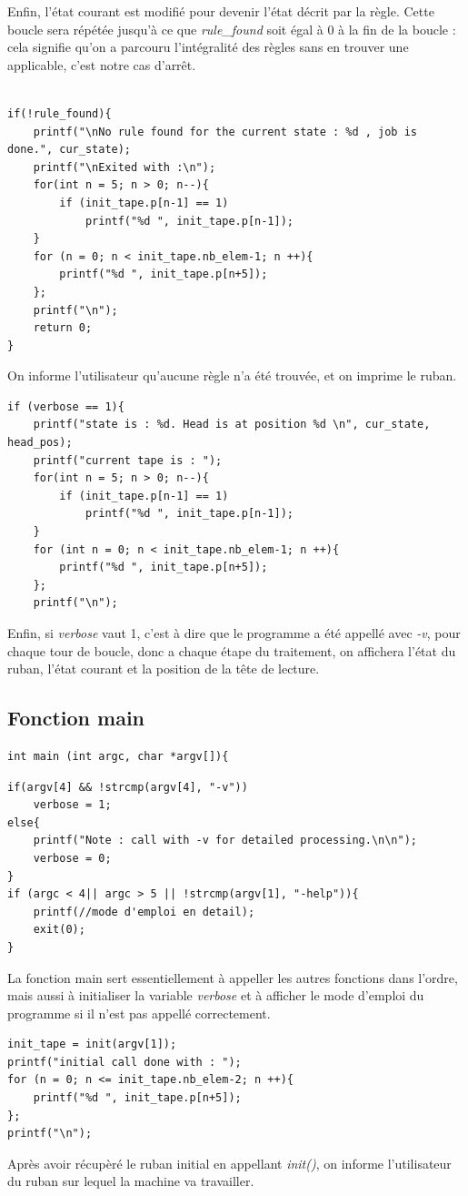 \documentclass[12pt,a4paper]{report}
\begin{document}
Enfin, l'état courant est modifié pour devenir l'état décrit par la règle. Cette boucle sera répétée jusqu'à ce que \textit{rule\_found} soit égal à 0 à la fin de la boucle : cela signifie qu'on a parcouru l'intégralité des règles sans en trouver une applicable, c'est notre cas d'arrêt.\\\\
\begin{lstlisting}
if(!rule_found){
    printf("\nNo rule found for the current state : %d , job is done.", cur_state);
    printf("\nExited with :\n");
    for(int n = 5; n > 0; n--){
        if (init_tape.p[n-1] == 1)
            printf("%d ", init_tape.p[n-1]);
    }
    for (n = 0; n < init_tape.nb_elem-1; n ++){
        printf("%d ", init_tape.p[n+5]);
    };
    printf("\n");
    return 0;
}
\end{lstlisting}
On informe l'utilisateur qu'aucune règle n'a été trouvée, et on imprime le ruban.\\
\begin{lstlisting}
if (verbose == 1){
    printf("state is : %d. Head is at position %d \n", cur_state, head_pos);
    printf("current tape is : ");
    for(int n = 5; n > 0; n--){
        if (init_tape.p[n-1] == 1)
            printf("%d ", init_tape.p[n-1]);
    }
    for (int n = 0; n < init_tape.nb_elem-1; n ++){
        printf("%d ", init_tape.p[n+5]);
    };
    printf("\n");
\end{lstlisting}
Enfin, si \textit{verbose} vaut 1, c'est à dire que le programme a été appellé avec \textit{-v}, pour chaque tour de boucle, donc a chaque étape du traitement, on affichera l'état du ruban, l'état courant et la position de la tête de lecture.

\subsection{Fonction main}
\begin{verbatim}
int main (int argc, char *argv[]){
\end{verbatim}

\begin{lstlisting}
if(argv[4] && !strcmp(argv[4], "-v"))
    verbose = 1;
else{
    printf("Note : call with -v for detailed processing.\n\n");
    verbose = 0;
}
if (argc < 4|| argc > 5 || !strcmp(argv[1], "-help")){
    printf(//mode d'emploi en detail);
    exit(0);
}
\end{lstlisting}
La fonction main sert essentiellement à appeller les autres fonctions dans l'ordre, mais aussi à initialiser la variable \textit{verbose} et à afficher le mode d'emploi du programme si il n'est pas appellé correctement.\\
\begin{lstlisting}
init_tape = init(argv[1]);
printf("initial call done with : ");
for (n = 0; n <= init_tape.nb_elem-2; n ++){
    printf("%d ", init_tape.p[n+5]);
};
printf("\n");
\end{lstlisting}
Après avoir récupèré le ruban initial en appellant \textit{init()}, on informe l'utilisateur du ruban sur lequel la machine va travailler.
\end{document}
